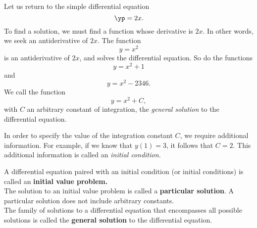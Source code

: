 Let us return to the simple differential equation
\[
\yp = 2x.
\]
To find a solution, we must find a function whose derivative is $2x$.  In other words, we seek an antiderivative of $2x.$  The function 
\[y = x^2\]
is an antiderivative of $2x$, and solves the differential equation.  So do the functions
\[y = x^2 + 1\]
and
\[y = x^2 - 2346.\]
We call the function
\[y = x^2 +  C,\]
with $C$ an arbitrary constant of integration, the \emph{general solution} to the differential equation.

In order to specify the value of the integration constant $C$, we require additional information.  For example, if we know that $y(1) = 3$, it follows that $C=2$.  This additional information is called an \emph{initial condition.}

{A differential equation paired with an initial condition (or initial conditions) is called an \textbf{initial value problem.}\\

The solution to an initial value problem is called a \textbf{particular solution}. A particular solution does not include arbitrary constants.\\

The family of solutions to a differential equation that encompasses all possible solutions is called the \textbf{general solution} to the differential equation.}\\


